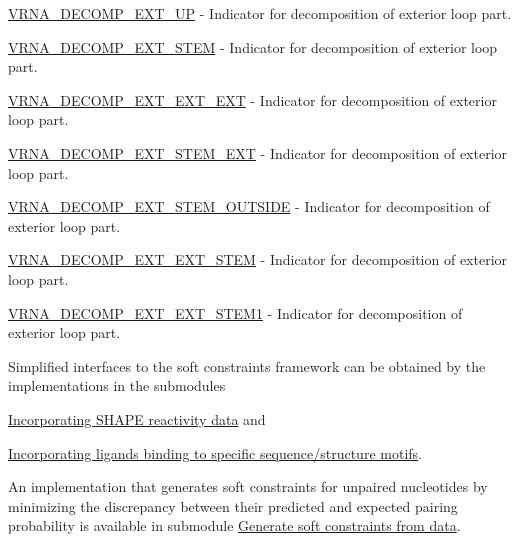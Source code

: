 \begin{DoxyItemize}
\item \hyperlink{group__constraints_gaff1ddaffe86d984623910b40cc8a8717}{V\+R\+N\+A\+\_\+\+D\+E\+C\+O\+M\+P\+\_\+\+E\+X\+T\+\_\+\+U\+P} -\/ Indicator for decomposition of exterior loop part.
\item \hyperlink{group__constraints_gae44b5ace0d9b4a29088069ecb4cec441}{V\+R\+N\+A\+\_\+\+D\+E\+C\+O\+M\+P\+\_\+\+E\+X\+T\+\_\+\+S\+T\+E\+M} -\/ Indicator for decomposition of exterior loop part.
\item \hyperlink{group__constraints_ga803bd818b3f4b2b0a4a5cfa2f7dc2045}{V\+R\+N\+A\+\_\+\+D\+E\+C\+O\+M\+P\+\_\+\+E\+X\+T\+\_\+\+E\+X\+T\+\_\+\+E\+X\+T} -\/ Indicator for decomposition of exterior loop part.
\item \hyperlink{group__constraints_gabb09c5b78b75a44502fc77b950125c1e}{V\+R\+N\+A\+\_\+\+D\+E\+C\+O\+M\+P\+\_\+\+E\+X\+T\+\_\+\+S\+T\+E\+M\+\_\+\+E\+X\+T} -\/ Indicator for decomposition of exterior loop part.
\item \hyperlink{group__constraints_gae7554cd3ff089360c02e4920229e221c}{V\+R\+N\+A\+\_\+\+D\+E\+C\+O\+M\+P\+\_\+\+E\+X\+T\+\_\+\+S\+T\+E\+M\+\_\+\+O\+U\+T\+S\+I\+D\+E} -\/ Indicator for decomposition of exterior loop part.
\item \hyperlink{group__constraints_ga06efd054c9271438f6d82d4559d9e69f}{V\+R\+N\+A\+\_\+\+D\+E\+C\+O\+M\+P\+\_\+\+E\+X\+T\+\_\+\+E\+X\+T\+\_\+\+S\+T\+E\+M} -\/ Indicator for decomposition of exterior loop part.
\item \hyperlink{group__constraints_ga2e75d7a77118735b32f25422d9686719}{V\+R\+N\+A\+\_\+\+D\+E\+C\+O\+M\+P\+\_\+\+E\+X\+T\+\_\+\+E\+X\+T\+\_\+\+S\+T\+E\+M1} -\/ Indicator for decomposition of exterior loop part.
\end{DoxyItemize}

Simplified interfaces to the soft constraints framework can be obtained by the implementations in the submodules


\begin{DoxyItemize}
\item \hyperlink{group__SHAPE__reactivities}{Incorporating S\+H\+A\+P\+E reactivity data} and
\item \hyperlink{group__ligands}{Incorporating ligands binding to specific sequence/structure motifs}.
\end{DoxyItemize}

An implementation that generates soft constraints for unpaired nucleotides by minimizing the discrepancy between their predicted and expected pairing probability is available in submodule \hyperlink{group__perturbation}{Generate soft constraints from data}. 

